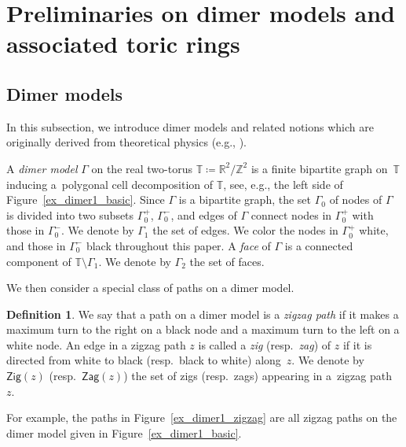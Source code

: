 \documentclass[10pt,a4paper]{amsart}
\numberwithin{equation}{section}
\theoremstyle{definition}
\newtheorem{Definition}[Theorem]{Definition}
\newcommand{\ZZ}{\mathbb{Z}}
\newcommand{\RR}{\mathbb{R}}
\newcommand{\TT}{\mathbb{T}}
\newcommand{\Zig}{\mathsf{Zig}}
\newcommand{\Zag}{\mathsf{Zag}}
\begin{document}
\section{Preliminaries on dimer models and associated toric rings}\label{sec_pre_dimer}

\subsection{Dimer models}\label{subsec_dimermodel}

In this subsection, we introduce dimer models and related notions which are originally derived from theoretical physics (e.g., \cite{fra_etal_gauge,FHK,HV}).

A \emph{dimer model} $\Gamma$ on the real two-torus $\TT\coloneqq\RR^2/\ZZ^2$ is a finite bipartite graph on~$\TT$
inducing a~polygonal cell decomposition of $\TT$, see, e.g., the left side of Figure~\ref{ex_dimer1_basic}.
Since $\Gamma$ is a bipartite graph, the set $\Gamma_0$ of nodes of $\Gamma$ is divided into two subsets $\Gamma_0^+$, $\Gamma_0^-$,
and edges of $\Gamma$ connect nodes in $\Gamma_0^+$ with those in $\Gamma_0^-$. We denote by $\Gamma_1$ the set of edges.
We color the nodes in $\Gamma_0^+$ white, and those in $\Gamma_0^-$ black throughout this paper.
A \emph{face} of $\Gamma$ is a connected component of $\TT{\setminus}\Gamma_1$. We denote by $\Gamma_2$ the set of faces.

We then consider a special class of paths on a dimer model.

\begin{Definition}\label{def_zigzag}
We say that a path on a dimer model is a \emph{zigzag path} if it makes a maximum turn to the right on a black node
and a maximum turn to the left on a white node.
An edge in a zigzag path $z$ is called a \emph{zig} (resp.\ \emph{zag}) of $z$ if it is directed from white to black (resp.\ black to white) along~$z$.
We denote by $\Zig(z)$ (resp.\ $\Zag(z)$) the set of zigs (resp.\ zags) appearing in a~zigzag path~$z$.
\end{Definition}

For example, the paths in Figure~\ref{ex_dimer1_zigzag} are all zigzag paths on the dimer model given in Figure~\ref{ex_dimer1_basic}.
\end{document}
